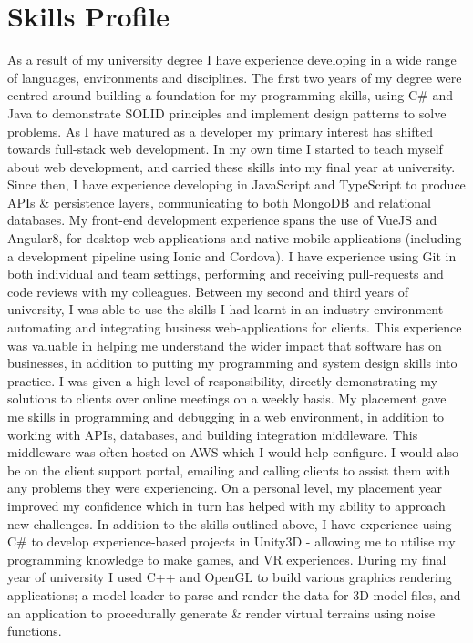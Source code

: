 \documentclass[1pt]{article}
\begin{document}
\section*{Skills Profile}
As a result of my university degree I have experience developing in a wide range of languages, environments and disciplines. The first two years of my degree were centred around building a foundation for my programming skills, using C\# and Java to demonstrate SOLID principles and implement design patterns to solve problems. As I have matured as a developer my primary interest has shifted towards full-stack web development. In my own time I started to teach myself about web development, and carried these skills into my final year at university. Since then, I have experience developing in JavaScript and TypeScript to produce APIs \& persistence layers, communicating to both MongoDB and relational databases. My front-end development experience spans the use of VueJS and Angular8, for desktop web applications and native mobile applications (including a development pipeline using Ionic and Cordova). I have experience using Git in both individual and team settings, performing and receiving pull-requests and code reviews with my colleagues.
\newline\newline
Between my second and third years of university, I was able to use the skills I had learnt in an industry environment - automating and integrating business web-applications for clients. This experience was valuable in helping me understand the wider impact that software has on businesses, in addition to putting my programming and system design skills into practice. I was given a high level of responsibility, directly demonstrating my solutions to clients over online meetings on a weekly basis. My placement gave me skills in programming and debugging in a web environment, in addition to working with APIs, databases, and building integration middleware. This middleware was often hosted on AWS which I would help configure. I would also be on the client support portal, emailing and calling clients to assist them with any problems they were experiencing. On a personal level, my placement year improved my confidence which in turn has helped with my ability to approach new challenges.
\newline\newline
In addition to the skills outlined above, I have experience using C\# to develop experience-based projects in Unity3D - allowing me to utilise my programming knowledge to make games, and VR experiences. During my final year of university I used C++ and OpenGL to build various graphics rendering applications;  a model-loader to parse and render the data for 3D model files, and an application to procedurally generate \& render virtual terrains using noise functions.
\end{document}

